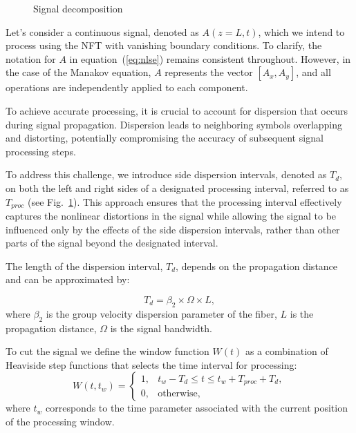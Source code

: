 \begin{figure}[!bp]
\caption{Signal decomposition}
\label{fig:periodical_signal}
\end{figure}

Let's consider a continuous signal, denoted as $A(z = L, t)$, which we intend to process using the NFT with vanishing boundary conditions. To clarify, the notation for $A$ in equation~(\ref{eq:nlse}) remains consistent throughout. However, in the case of the Manakov equation, $A$ represents the vector $[A_x, A_y]$, and all operations are independently applied to each component.

To achieve accurate processing, it is crucial to account for dispersion that occurs during signal propagation. Dispersion leads to neighboring symbols overlapping and distorting, potentially compromising the accuracy of subsequent signal processing steps.

To address this challenge, we introduce side dispersion intervals, denoted as $T_d$, on both the left and right sides of a designated processing interval, referred to as $T_{proc}$ (see Fig.~\ref{fig:periodical_signal}). This approach ensures that the processing interval effectively captures the nonlinear distortions in the signal while allowing the signal to be influenced only by the effects of the side dispersion intervals, rather than other parts of the signal beyond the designated interval.

The length of the dispersion interval, $T_d$, depends on the propagation distance and can be approximated by:

\begin{equation}
    T_d = \beta_2 \times \Omega \times L {,}
\end{equation}
where $\beta_2$ is the group velocity dispersion parameter of the fiber, $L$ is the propagation distance, $\Omega$ is the signal bandwidth.

To cut the signal we define the window function $W(t)$ as a combination of Heaviside step functions that selects the time interval for processing:
\begin{equation}
W(t, t_w) = \begin{cases}
1, & t_w - T_d \leq t \leq t_w + T_{proc} + T_d, \\
0, & \text{otherwise} {,}
\end{cases}
\end{equation}
where $t_w$ corresponds to the time parameter associated with the current position of the processing window.

